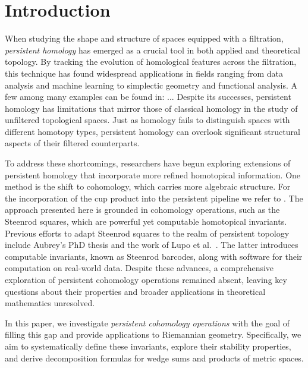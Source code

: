 
\section{Introduction} \label{s:introduction}

When studying the shape and structure of spaces equipped with a filtration, \textit{persistent homology} has emerged as a crucial tool in both applied and theoretical topology.
By tracking the evolution of homological features across the filtration, this technique has found widespread applications in fields ranging from data analysis and machine learning to simplectic geometry and functional analysis.
A few among many examples can be found in: ... 
Despite its successes, persistent homology has limitations that mirror those of classical homology in the study of unfiltered topological spaces.
Just as homology fails to distinguish spaces with different homotopy types, persistent homology can overlook significant structural aspects of their filtered counterparts.

To address these shortcomings, researchers have begun exploring extensions of persistent homology that incorporate more refined homotopical information. One method is the shift to cohomology, which carries more algebraic structure.
For the incorporation of the cup product into the persistent pipeline we refer to \cite{contessoto_et_al:LIPIcs.SoCG.2022.31, memoli2024persistent, huang2005cup, yarmola2010persistence, herscovich2018higher, belchi2021a, contreras2022persistent}.
The approach presented here is grounded in cohomology operations, such as the Steenrod squares, which are powerful yet computable homotopical invariants.
Previous efforts to adapt Steenrod squares to the realm of persistent topology include Aubrey's PhD thesis \cite{aubrey2011thesis} and the work of Lupo et al.\ \cite{medina2022per_st}.
The latter introduces computable invariants, known as Steenrod barcodes, along with software for their computation on real-world data.
Despite these advances, a comprehensive exploration of persistent cohomology operations remained absent, leaving key questions about their properties and broader applications in theoretical mathematics unresolved.

In this paper, we investigate \textit{persistent cohomology operations} with the goal of filling this gap and provide applications to Riemannian geometry.
Specifically, we aim to systematically define these invariants, explore their stability properties, and derive decomposition formulas for wedge sums and products of metric spaces.


